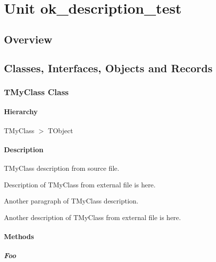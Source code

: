 \documentclass{report}
\begin{document}
\newlength{\tmplength}
\chapter{Unit ok{\_}description{\_}test}
\section{Overview}
\begin{description}
\item[\texttt{\begin{ttfamily}TMyClass\end{ttfamily} Class}]
\end{description}
\section{Classes, Interfaces, Objects and Records}
\subsection*{TMyClass Class}
\subsubsection*{\large{\textbf{Hierarchy}}\normalsize\hspace{1ex}\hfill}
TMyClass {$>$} TObject
\subsubsection*{\large{\textbf{Description}}\normalsize\hspace{1ex}\hfill}
TMyClass description from source file.

Description of TMyClass from external file is here.

Another paragraph of TMyClass description.

Another description of TMyClass from external file is here.\subsubsection*{\large{\textbf{Methods}}\normalsize\hspace{1ex}\hfill}
\paragraph*{Foo}\hspace*{\fill}
\end{document}
